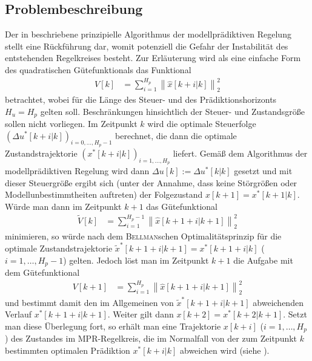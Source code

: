 \subsection{Problembeschreibung}
\label{subsec:kap_4_problembeschreibung}
Der in  beschriebene prinzipielle Algorithmus der modellprädiktiven Regelung stellt eine Rückführung dar, womit
potenziell die Gefahr der Instabilität des entstehenden Regelkreises besteht. Zur Erläuterung wird als eine einfache Form des quadratischen Gütefunktionals das Funktional
\begin{align}
	V[k] & = \sum\limits_{i=1}^{H_p}\left\| \hat{x}[k+i|k] \right\|_2^2
\end{align}
betrachtet, wobei für die Länge des Steuer- und des Prädiktionshorizonts $H_u=H_p$ gelten soll. Beschränkungen hinsichtlich der Steuer- und Zustandsgröße sollen nicht vorliegen. Im
Zeitpunkt $k$ wird die optimale Steuerfolge $(\Delta u^{\ast}[k+i|k])_{i=0,\ldots,H_p-1}$ berechnet, die dann die optimale Zustandstrajektorie $(x^{\ast}[k+i|k])_{i=1,\ldots,H_p}$
liefert. Gemäß dem Algorithmus der modellprädiktiven Regelung wird dann $\Delta u[k]:=\Delta u^{\ast}[k|k]$ gesetzt und mit dieser Steuergröße ergibt
sich (unter der Annahme, dass keine Störgrößen oder Modellunbestimmtheiten auftreten) der Folgezustand $x[k+1]=x^{\ast}[k+1|k]$. Würde man dann im
Zeitpunkt $k+1$ das Gütefunktional
\begin{align}
	\tilde{V}[k] & = \sum\limits_{i=1}^{H_p-1}\left\| \hat{x}[k+1+i|k+1] \right\|_2^2
\end{align}
minimieren, so würde nach dem \textsc{Bellman}schen Optimalitätsprinzip für die optimale Zustandstrajektorie $\tilde{x}^{\ast}[k+1+i|k+1]=x^{\ast}[k+1+i|k]$ ($i=1,\ldots,H_p-1$) gelten.
Jedoch löst man im Zeitpunkt $k+1$ die Aufgabe mit dem Gütefunktional
\begin{align}
	V[k+1] & = \sum\limits_{i=1}^{H_p}\left\| \hat{x}[k+1+i|k+1] \right\|_2^2
\end{align}
und bestimmt damit den im Allgemeinen von $\tilde{x}^{\ast}[k+1+i|k+1]$ abweichenden Verlauf $x^{\ast}[k+1+i|k+1]$. Weiter gilt dann $x[k+2]=x^{\ast}[k+2|k+1]$. Setzt man diese
Überlegung fort, so erhält man eine Trajektorie $x[k+i]$ ($i=1,\ldots,H_p$) des Zustandes im \ac{MPR}-Regelkreis, die im Normalfall von der zum Zeitpunkt $k$ bestimmten optimalen
Prädiktion $x^{\ast}[k+i|k]$ abweichen wird (siehe ).

